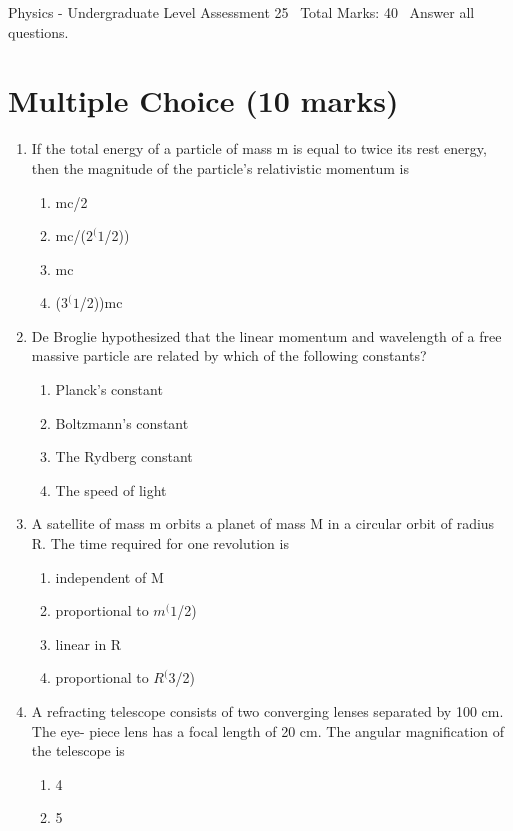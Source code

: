 \documentclass[12pt]{article}
\begin{document}
\begin{center}
Physics - Undergraduate Level Assessment 25 \
Total Marks: 40 \
Answer all questions.
\end{center}

\section*{Multiple Choice (10 marks)}
\begin{enumerate}[label=\arabic*.]
\item If the total energy of a particle of mass m is equal to twice its rest energy, then the magnitude of the particle's relativistic momentum is
\begin{enumerate}[label=(\alph*)]
    \item mc/2
    \item mc/($2^(1$/2))
    \item mc
    \item ($3^(1$/2))mc
\end{enumerate}
\item De Broglie hypothesized that the linear momentum and wavelength of a free massive particle are related by which of the following constants?
\begin{enumerate}[label=(\alph*)]
    \item Planck's constant
    \item Boltzmann's constant
    \item The Rydberg constant
    \item The speed of light
\end{enumerate}
\item A satellite of mass m orbits a planet of mass M in a circular orbit of radius R. The time required for one revolution is
\begin{enumerate}[label=(\alph*)]
    \item independent of M
    \item proportional to $m^(1$/2)
    \item linear in R
    \item proportional to $R^(3$/2)
\end{enumerate}
\item A refracting telescope consists of two converging lenses separated by 100 cm. The eye- piece lens has a focal length of 20 cm. The angular magnification of the telescope is
\begin{enumerate}[label=(\alph*)]
    \item 4
    \item 5

\end{enumerate}
\end{enumerate}
\end{document}
